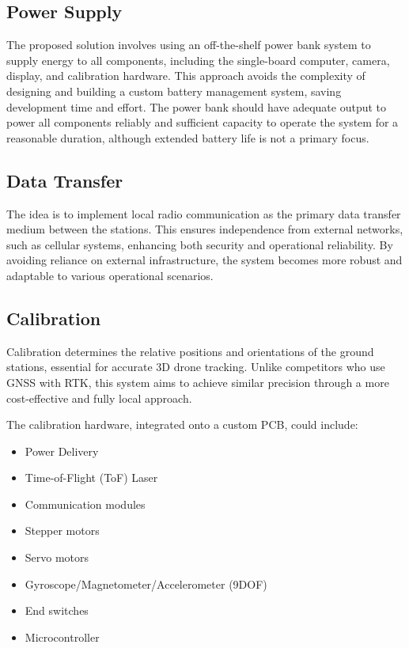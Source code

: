 \subsection{Power Supply}
The proposed solution involves using an off-the-shelf power bank system to supply energy to all components, including the single-board computer, camera, display, and calibration hardware. This approach avoids the complexity of designing and building a custom battery management system, saving development time and effort. The power bank should have adequate output to power all components reliably and sufficient capacity to operate the system for a reasonable duration, although extended battery life is not a primary focus.

\subsection{Data Transfer}
The idea is to implement local radio communication as the primary data transfer medium between the stations. This ensures independence from external networks, such as cellular systems, enhancing both security and operational reliability. By avoiding reliance on external infrastructure, the system becomes more robust and adaptable to various operational scenarios.

\subsection{Calibration}
Calibration determines the relative positions and orientations of the ground stations, essential for accurate 3D drone tracking. Unlike competitors who use GNSS with RTK, this system aims to achieve similar precision through a more cost-effective and fully local approach. 

The calibration hardware, integrated onto a custom PCB, could include:
\begin{itemize}
	\item Power Delivery
	\item Time-of-Flight (ToF) Laser
	\item Communication modules
	\item Stepper motors
	\item Servo motors
	\item Gyroscope/Magnetometer/Accelerometer (9DOF)
	\item End switches
	\item Microcontroller
\end{itemize}

